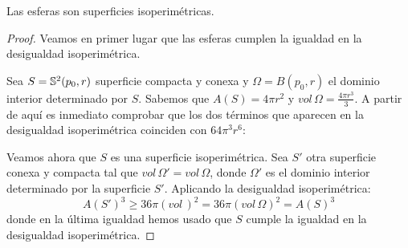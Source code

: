 \begin{proposition}\label{propo1}
Las esferas son superficies isoperimétricas.
\end{proposition}
\begin{proof}
Veamos en primer lugar que las esferas cumplen la igualdad en la desigualdad isoperimétrica.

Sea $S=\mathbb{S}^2(p_0,r)$ superficie compacta y conexa y $\Omega = B(p_0,r)$ el dominio interior determinado por $S$. Sabemos que $A(S)=4\pi r^2$ y $vol \, \Omega = \frac{4\pi r^3}{3}$. A partir de aquí es inmediato comprobar que los dos términos que aparecen en la desigualdad isoperimétrica coinciden con $64\pi^3r^6$:

Veamos ahora que $S$ es una superficie isoperimétrica. Sea $S'$ otra superficie conexa y compacta tal que $vol \, \Omega' = vol \, \Omega$, donde $\Omega'$ es el dominio interior determinado por la superficie $S'$. Aplicando la desigualdad isoperimétrica:
%
\begin{equation*}
    A(S')^3 \geq 36\pi (vol \,)^2 = 36\pi (vol \, \Omega)^2 = A(S)^3 
\end{equation*}
%
donde en la última igualdad hemos usado que $S$ cumple la igualdad en la desigualdad isoperimétrica.
\end{proof}

